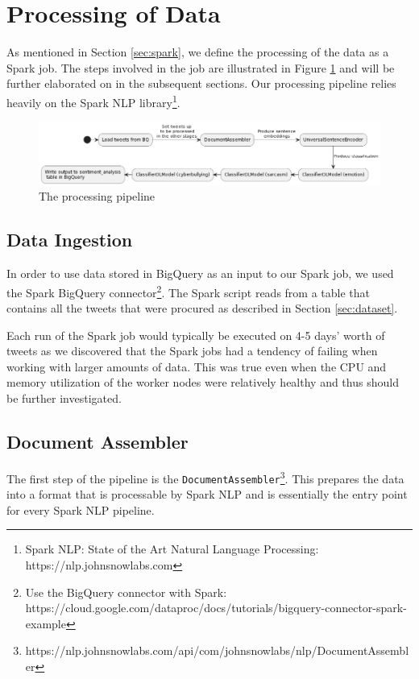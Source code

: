 \documentclass[a4paper,12pt]{article}
\begin{document}
\section{Processing of Data}

As mentioned in Section \ref{sec:spark}, we define the processing of the data as a Spark job. The steps involved in the job are illustrated in Figure \ref{fig:data-processing-pipeline} and will be further elaborated on in the subsequent sections. Our processing pipeline relies heavily on the Spark NLP library\footnote{Spark NLP: State of the Art Natural Language Processing: https://nlp.johnsnowlabs.com}.

\begin{figure}[h]
\centering
\includegraphics[width=\textwidth]{data-processing.png}
\caption{The processing pipeline}
\label{fig:data-processing-pipeline}
\end{figure}

\subsection{Data Ingestion}
In order to use data stored in BigQuery as an input to our Spark job, we used the Spark BigQuery connector\footnote{Use the BigQuery connector with Spark: https://cloud.google.com/dataproc/docs/tutorials/bigquery-connector-spark-example}. The Spark script reads from a table that contains all the tweets that were procured as described in Section \ref{sec:dataset}. 

Each run of the Spark job would typically be executed on 4-5 days' worth of tweets as we discovered that the Spark jobs had a tendency of failing when working with larger amounts of data. This was true even when the CPU and memory utilization of the worker nodes were relatively healthy and thus should be further investigated.

\subsection{Document Assembler}
The first step of the pipeline is the \texttt{DocumentAssembler}\footnote{https://nlp.johnsnowlabs.com/api/com/johnsnowlabs/nlp/DocumentAssembler}. This prepares the data into a format that is processable by Spark NLP and is essentially the entry point for every Spark NLP pipeline.
\end{document}

